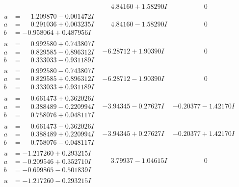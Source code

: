 \documentclass[1p]{elsarticle_modified}
\theoremstyle{definition}
\begin{document}
$$\begin{array}{c|c|c}
 & \phantom{-}4.84160 + 1.58290 I & \phantom{-0.000000 } 0 \\ \hline\begin{aligned}
u &= \phantom{-}1.209870 - 0.001472 I \\
a &= \phantom{-}0.291036 + 0.003235 I \\
b &= -0.958064 + 0.487956 I\end{aligned}
 & \phantom{-}4.84160 - 1.58290 I & \phantom{-0.000000 } 0 \\ \hline\begin{aligned}
u &= \phantom{-}0.992580 + 0.743807 I \\
a &= \phantom{-}0.829585 - 0.896312 I \\
b &= \phantom{-}0.333033 - 0.931189 I\end{aligned}
 & -6.28712 + 1.90390 I & \phantom{-0.000000 } 0 \\ \hline\begin{aligned}
u &= \phantom{-}0.992580 - 0.743807 I \\
a &= \phantom{-}0.829585 + 0.896312 I \\
b &= \phantom{-}0.333033 + 0.931189 I\end{aligned}
 & -6.28712 - 1.90390 I & \phantom{-0.000000 } 0 \\ \hline\begin{aligned}
u &= \phantom{-}0.661473 + 0.362026 I \\
a &= \phantom{-}0.388489 - 0.220994 I \\
b &= \phantom{-}0.758076 + 0.048117 I\end{aligned}
 & -3.94345 - 0.27627 I & -0.20377 - 1.42170 I \\ \hline\begin{aligned}
u &= \phantom{-}0.661473 - 0.362026 I \\
a &= \phantom{-}0.388489 + 0.220994 I \\
b &= \phantom{-}0.758076 - 0.048117 I\end{aligned}
 & -3.94345 + 0.27627 I & -0.20377 + 1.42170 I \\ \hline\begin{aligned}
u &= -1.217260 + 0.293215 I \\
a &= -0.209546 + 0.352710 I \\
b &= -0.699865 - 0.501839 I\end{aligned}
 & \phantom{-}3.79937 - 1.04615 I & \phantom{-0.000000 } 0 \\ \hline\begin{aligned}
u &= -1.217260 - 0.293215 I \\

\end{aligned}
\end{array}$$
\end{document}

